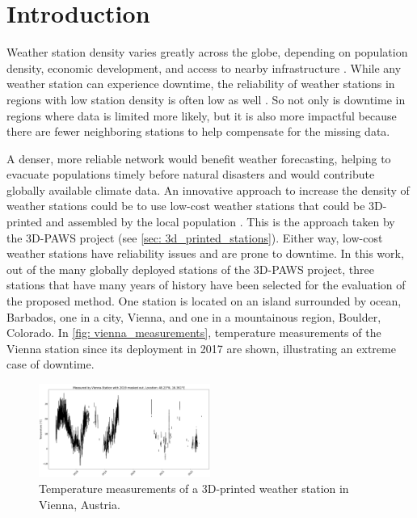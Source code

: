 \section{Introduction}
\label{sec: introduction}


Weather station density varies greatly across the globe, depending on population density, economic development, and access to nearby infrastructure \cite{ortizbobea2021}.
While any weather station can experience downtime, the reliability of weather stations in regions with low station density is often low as well \cite{Mistry2022GlobalWS}.
So not only is downtime in regions where data is limited more likely, but it is also more impactful because there are fewer neighboring stations to help compensate for the missing data.

A denser, more reliable network would benefit weather forecasting, helping to evacuate populations timely before natural disasters \cite{muita2021} and would contribute globally available climate data.
An innovative approach to increase the density of weather stations could be to use low-cost weather stations that could be 3D-printed and assembled by the local population \cite{muita2021}. This is the approach taken by the 3D-PAWS project (see \autoref{sec: 3d_printed_stations}).
Either way, low-cost weather stations have reliability issues and are prone to downtime.
In this work, out of the many globally deployed stations of the 3D-PAWS project, three stations that have many years of history have been selected for the evaluation of the proposed method.
One station is located on an island surrounded by ocean, Barbados, one in a city, Vienna, and one in a mountainous region, Boulder, Colorado. In \autoref{fig: vienna_measurements}, temperature measurements of the Vienna station since its deployment in 2017 are shown, illustrating an extreme case of downtime.

\begin{figure}[H]
    \centering
    \includegraphics[width=0.5\textwidth]{resources/images/charts/vienna_available_measurements_bw.png}
    \caption{Temperature measurements of a 3D-printed weather station in Vienna, Austria.}
    \label{fig: vienna_measurements}
\end{figure}

